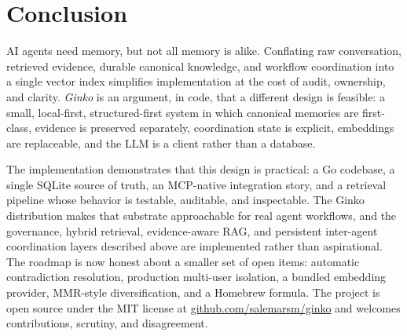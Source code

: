 \documentclass[11pt,a4paper]{article}
\begin{document}
\section{Conclusion}

AI agents need memory, but not all memory is alike. Conflating raw conversation, retrieved evidence, durable canonical knowledge, and workflow coordination into a single vector index simplifies implementation at the cost of audit, ownership, and clarity. \textit{Ginko} is an argument, in code, that a different design is feasible: a small, local-first, structured-first system in which canonical memories are first-class, evidence is preserved separately, coordination state is explicit, embeddings are replaceable, and the LLM is a client rather than a database.

The implementation demonstrates that this design is practical: a Go codebase, a single SQLite source of truth, an MCP-native integration story, and a retrieval pipeline whose behavior is testable, auditable, and inspectable. The Ginko distribution makes that substrate approachable for real agent workflows, and the governance, hybrid retrieval, evidence-aware RAG, and persistent inter-agent coordination layers described above are implemented rather than aspirational. The roadmap is now honest about a smaller set of open items: automatic contradiction resolution, production multi-user isolation, a bundled embedding provider, MMR-style diversification, and a Homebrew formula. The project is open source under the MIT license at \href{https://github.com/salemarsm/ginko}{github.com/salemarsm/ginko} and welcomes contributions, scrutiny, and disagreement.
\end{document}
